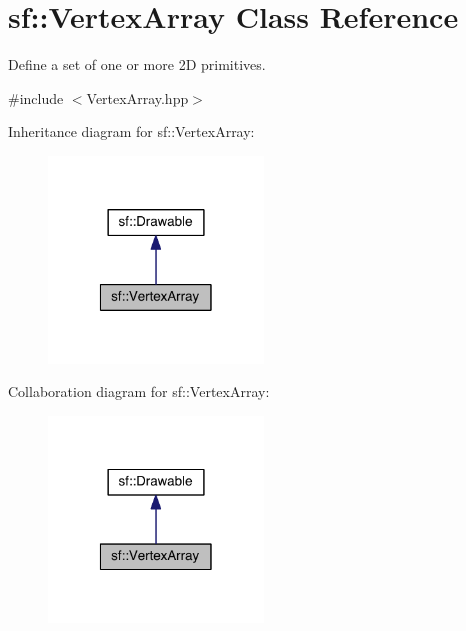 \hypertarget{classsf_1_1_vertex_array}{\section{sf\-:\-:Vertex\-Array Class Reference}
\label{classsf_1_1_vertex_array}
}


Define a set of one or more 2\-D primitives.  




{\ttfamily \#include $<$Vertex\-Array.\-hpp$>$}



Inheritance diagram for sf\-:\-:Vertex\-Array\-:
\nopagebreak
\begin{figure}[H]
\begin{center}
\leavevmode
\includegraphics[width=162pt]{classsf_1_1_vertex_array__inherit__graph}
\end{center}
\end{figure}


Collaboration diagram for sf\-:\-:Vertex\-Array\-:
\nopagebreak
\begin{figure}[H]
\begin{center}
\leavevmode
\includegraphics[width=162pt]{classsf_1_1_vertex_array__coll__graph}
\end{center}
\end{figure}
